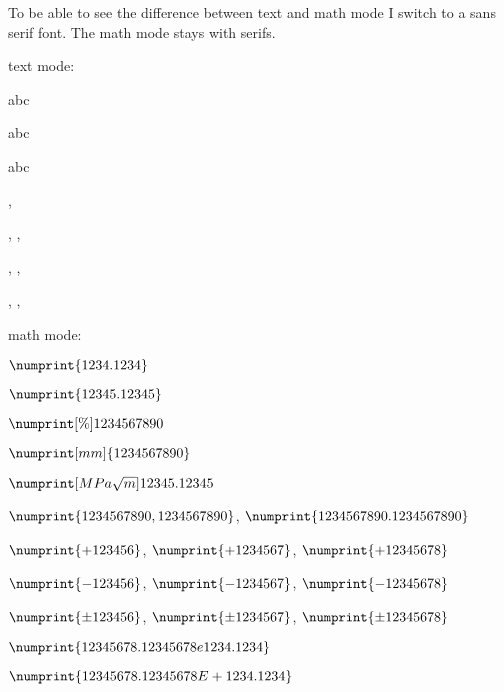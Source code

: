 \documentclass[portuges,french,ngerman,english,a4paper,fleqn,11pt]{article}
\begin{document}
\sffamily
To be able to see the difference between text and math mode I switch
to a sans serif font. The math mode stays with serifs.

text mode:

 abc

 abc

 abc





, 

, , 

, , 

, , 









\bigskip
math mode:

$\numprint{1234.1234}$

$\numprint{12345.12345}$

$\numprint[\%]{1234567890}$

$\numprint[mm]{1234567890}$

$\numprint[MPa\sqrt{m}]{12345.12345}$

$\numprint{1234567890,1234567890}$, $\numprint{1234567890.1234567890}$

$\numprint{+123456}$, $\numprint{+1234567}$, $\numprint{+12345678}$

$\numprint{-123456}$, $\numprint{-1234567}$, $\numprint{-12345678}$

$\numprint{\pm 123456}$, $\numprint{\pm 1234567}$, $\numprint{\pm 12345678}$

$\numprint{12345678.12345678e1234.1234}$

$\numprint{12345678.12345678E+1234.1234}$
\end{document}
